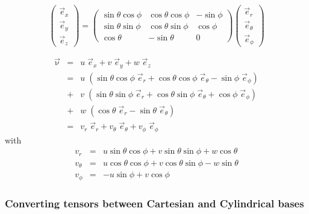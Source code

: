 \[
\left(
\begin{array}{c}
\vec{e}_{x} \\ \vec{e}_y \\ \vec{e}_z
\end{array}
\right)
=
\left(
\begin{array}{ccc}
\sin\theta \cos\phi & \cos\theta\cos\phi & -\sin\phi  \\
\sin\theta \sin\phi & \cos\theta\sin\phi & \cos\phi \\
\cos\theta & -\sin\theta & 0
\end{array}
\right)
\left(
\begin{array}{c}
\vec{e}_{r} \\ \vec{e}_\theta \\ \vec{e}_\phi
\end{array}
\right)
\]

\begin{eqnarray}
\vec{\upnu} 
&=& u\; \vec{e}_x + v \; \vec{e}_y + w \; \vec{e}_z \\
&=& u\; ( \sin\theta \cos\phi \; \vec{e}_r +  \cos\theta\cos\phi \;  \vec{e}_{\theta} -\sin\phi \; \vec{e}_{\phi} ) \\
&+& v\; ( \sin\theta \sin\phi \; \vec{e}_r + \cos\theta\sin\phi \; \vec{e}_\theta  +  \cos\phi \;  \vec{e}_\phi  )  \\
&+& w\; ( \cos\theta \; \vec{e}_r   -\sin\theta \; \vec{e}_\theta  ) \\
&=& v_r\; \vec{e}_r + v_\theta\; \vec{e}_\theta + v_\phi\; \vec{e}_\phi 
\end{eqnarray}
with 
\begin{eqnarray}
v_r      &=&  u \sin \theta  \cos \phi  + v \sin\theta \sin \phi + w \cos\theta \\
v_\theta &=&  u \cos\theta\cos\phi + v \cos\theta\sin\phi -w \sin\theta   \\
v_\phi   &=& -u \sin\phi  + v \cos\phi  
\end{eqnarray}

\subsubsection{Converting tensors between Cartesian and Cylindrical bases \label{ss:convcartspher}}


